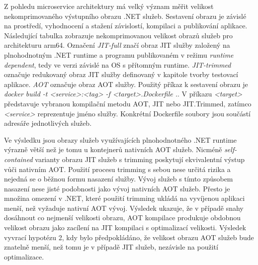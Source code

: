 Z pohledu microservice architektury má velký význam měřit velikost nekomprimovaného výstupního obrazu .NET služeb. Sestavení obrazu je závislé na prostředí, vyhodnocení a stažení závislostí, kompilaci a publikování aplikace. Následující tabulka zobrazuje nekomprimovanou velikost obrazů služeb pro architekturu arm64. Označení \emph{JIT-full} značí obraz JIT služby založený na plnohodnotným .NET runtime a programu publikovaném v režimu \emph{runtime dependent}, tedy ve verzi závislé na OS s přítomným runtime. \emph{JIT-trimmed} označuje redukovaný obraz JIT služby definovaný v kapitole tvorby testovací aplikace. \emph{AOT} označuje obraz AOT služby. Použitý příkaz k sestavení obrazu je \emph{docker build -t <service>:<tag> -f <target>.Dockerfile .}. V příkazu \emph{<target>} představuje vybranou kompilační metodu AOT, JIT nebo JIT.Trimmed, zatímco \emph{<service>} reprezentuje jméno služby. Konkrétní Dockerfile soubory jsou součástí adresáře jednotlivých služeb.


Ve výsledku jsou obrazy služeb využívajících plnohodnotného .NET runtime výrazně větší než je tomu u kontejnerů nativních AOT služeb. Nicméně \emph{self-contained} varianty obrazu JIT služeb s trimming poskytují ekvivalentní výstup vůči nativním AOT. Použití procesu trimming s sebou nese určitá rizika a nejedná se o běžnou formu nasazení služby. Vývoj služeb s tímto způsobem nasazení nese jisté podobnosti jako vývoj nativních AOT služeb. Přesto je množina omezení v .NET, které použití trimming ukládá na vyvíjenou aplikaci menší, než vyžaduje nativní AOT vývoj. Výsledek ukazuje, že v případě snahy dosáhnout co nejmenší velikosti obrazu, AOT kompilace produkuje obdobnou velikost obrazu jako zacílení na JIT kompilaci s optimalizací velikosti. Výsledek vyvrací hypotézu 2, kdy bylo předpokládáno, že velikost obrazu AOT služeb bude znatelně menší, než tomu je v případě JIT služeb, nezávisle na použití optimalizace.


